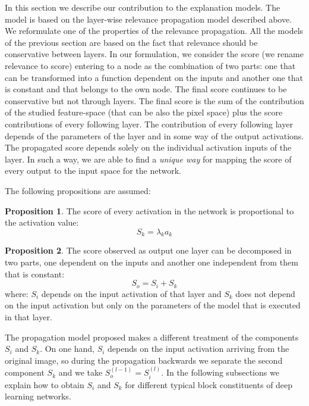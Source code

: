 \documentclass[preprint]{elsarticle}
\theoremstyle{definition} %
\newtheorem{proposition}{Proposition}%
\theoremstyle{remark}
\begin{document}
In this section we describe our contribution to the explanation models. The model is based on the layer-wise relevance propagation model described above. We reformulate one of the properties of the relevance propagation. All the models of the previous section are based on the fact that relevance should be conservative between layers. In our formulation, we consider the score (we rename relevance to score) entering to a node as the combination of two parts: one that can be transformed into a function dependent on the inputs and another one that is constant and that belongs to the own node. The final score continues to be conservative but not through layers. The final score is the sum of the contribution of the studied feature-space (that can be also the pixel space) plus the score contributions of every following layer. The contribution of every following layer depends of the parameters of the layer and in some way of the output activations. The propagated score depends solely on the individual activation inputs of the layer. In such a way, we are able to find a \emph{unique way} for mapping the score of every output to the input space for the network.

The following propositions are assumed:

\begin{proposition}
	The score of every activation in the network is proportional to the activation value:
	\begin{equation}
		 S_k = \lambda_k a_k
	\end{equation}
\end{proposition}

\begin{proposition}
	The score observed as output one layer can be decomposed in two parts, one dependent on the inputs and another one independent from them that is constant: 
	\begin{equation}
		S_o=S_i+S_k
	\end{equation}
	 where: $S_i$ depends on the input activation of that layer and $S_k$ does not depend on the input activation but only on the parameters of the model that is executed in that layer.
\end{proposition}

The propagation model proposed makes a different treatment of the components $S_i$ and $S_k$. On one hand, $S_i$ depends on the input activation arriving from the original image, so during the propagation backwards we separate the second component $S_k$ and we take $S_o^{(l-1)}=S_i^{(l)}$. In the following subsections we explain how to obtain $S_i$ and $S_k$ for different typical block constituents of deep learning networks.
\end{document}
